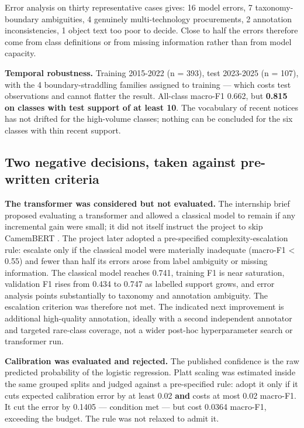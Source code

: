 Error analysis on thirty representative cases gives: 16 model errors, 7 taxonomy-boundary ambiguities, 4 genuinely multi-technology procurements, 2 annotation inconsistencies, 1 object text too poor to decide. Close to half the errors therefore come from class definitions or from missing information rather than from model capacity.

\textbf{Temporal robustness.} Training 2015-2022 (n = 393), test 2023-2025 (n = 107), with the 4 boundary-straddling families assigned to training --- which costs test observations and cannot flatter the result. All-class macro-F1 0.662, but \textbf{0.815 on classes with test support of at least 10}. The vocabulary of recent notices has not drifted for the high-volume classes; nothing can be concluded for the six classes with thin recent support.

\subsection{Two negative decisions, taken against pre-written criteria}

\textbf{The transformer was considered but not evaluated.} The internship brief proposed evaluating a transformer and allowed a classical model to remain if any incremental gain were small; it did not itself instruct the project to skip CamemBERT \citep{martin2020}. The project later adopted a pre-specified complexity-escalation rule: escalate only if the classical model were materially inadequate (macro-F1 \textless{} 0.55) and fewer than half its errors arose from label ambiguity or missing information. The classical model reaches 0.741, training F1 is near saturation, validation F1 rises from 0.434 to 0.747 as labelled support grows, and error analysis points substantially to taxonomy and annotation ambiguity. The escalation criterion was therefore not met. The indicated next improvement is additional high-quality annotation, ideally with a second independent annotator and targeted rare-class coverage, not a wider post-hoc hyperparameter search or transformer run.

\textbf{Calibration was evaluated and rejected.} The published confidence is the raw predicted probability of the logistic regression. Platt scaling was estimated inside the same grouped splits and judged against a pre-specified rule: adopt it only if it cuts expected calibration error by at least 0.02 \textbf{and} costs at most 0.02 macro-F1. It cut the error by 0.1405 --- condition met --- but cost 0.0364 macro-F1, exceeding the budget. The rule was not relaxed to admit it.

